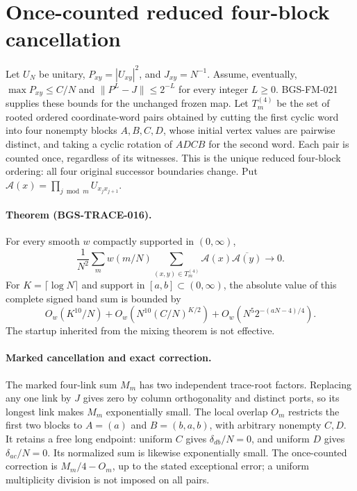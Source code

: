 \section{Once-counted reduced four-block cancellation}
\label{sec:four-block-unmarking}
Let $U_N$ be unitary, $P_{xy}=|U_{xy}|^2$, and $J_{xy}=N^{-1}$.
Assume, eventually, $\max P_{xy}\leq C/N$ and
$\|P^L-J\|\leq2^{-L}$ for every integer $L\geq0$.
BGS-FM-021 supplies these bounds for the unchanged frozen map.
Let $T_m^{(4)}$ be the set of rooted ordered coordinate-word pairs obtained
by cutting the first cyclic word into four nonempty blocks $A,B,C,D$,
whose initial vertex values are pairwise distinct, and taking a cyclic
rotation of $ADCB$ for the second word. Each pair is counted once,
regardless of its witnesses. This is the unique reduced four-block ordering:
all four original successor boundaries change.
Put $\mathcal A(x)=\prod_{j\bmod m}U_{x_jx_{j+1}}$.

\paragraph{Theorem (BGS-TRACE-016).}
For every smooth $w$ compactly supported in $(0,\infty)$,
\[
 \frac1{N^2}\sum_m w(m/N)
 \sum_{(x,y)\in T_m^{(4)}}
 \mathcal A(x)\overline{\mathcal A(y)}\longrightarrow0.
\]
For $K=\lceil\log N\rceil$ and support in $[a,b]\subset(0,\infty)$,
the absolute value of this complete signed band sum is bounded by
\[
 O_w(K^{10}/N)+O_w\!\left(N^{10}(C/N)^{K/2}\right)
 +O_w\!\left(N^5 2^{-(aN-4)/4}\right).
\]
The startup inherited from the mixing theorem is not effective.

\paragraph{Marked cancellation and exact correction.}
The marked four-link sum $M_m$ has two independent trace-root factors.
Replacing any one link by $J$ gives zero by column orthogonality and
distinct ports, so its longest link makes $M_m$ exponentially small.
The local overlap $O_m$ restricts the first two blocks to
$A=(a)$ and $B=(b,a,b)$, with arbitrary nonempty $C,D$.
It retains a free long endpoint: uniform $C$ gives $\delta_{db}/N=0$,
and uniform $D$ gives $\delta_{ac}/N=0$.
Its normalized sum is likewise exponentially small.
The once-counted correction is $M_m/4-O_m$, up to the stated exceptional
error; a uniform multiplicity division is not imposed on all pairs.

